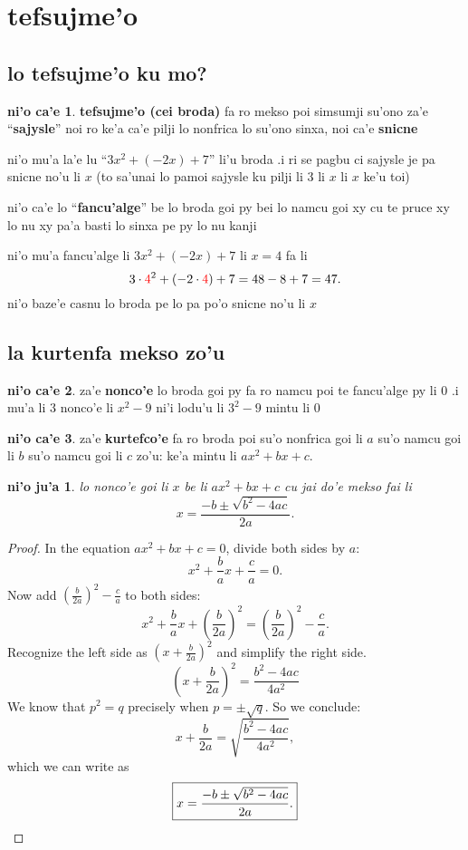 \documentclass[12pt,a4paper]{article}
\newcommand{\red}[1]{{\color{red}#1}}
\theoremstyle{plain}\newtheorem*{mythm}{ni'o ju'a}
\theoremstyle{definition}\newtheorem*{mydef}{ni'o ca'e}
\begin{document}
\section{tefsujme'o}
\subsection{lo tefsujme'o ku mo?}
\begin{mydef}
	\textbf{tefsujme'o (cei broda)} fa ro mekso poi simsumji su'ono za'e ``\textbf{sajysle}'' noi ro ke'a ca'e pilji lo nonfrica lo su'ono sinxa, noi ca'e \textbf{snicne}
\end{mydef}

ni'o mu'a la'e lu ``$3x^2 + (-2x) + 7$'' li'u broda .i ri se pagbu ci sajysle je pa snicne no'u li $x$ (to sa'unai lo pamoi sajysle ku pilji li $3$ li $x$ li $x$ ke'u toi)

ni'o ca'e lo ``\textbf{fancu'alge}'' be lo broda goi py bei lo namcu goi xy cu te pruce xy lo nu xy pa'a basti lo sinxa pe py lo nu kanji

ni'o mu'a fancu'alge li $3x^2 + (-2x) + 7$ li $x=4$ fa li \[
3 \cdot \red{4}^2 + (-2 \cdot \red{4}) + 7 = 48 - 8 + 7 = 47.
\]
ni'o baze'e casnu lo broda pe lo pa po'o snicne no'u li $x$

\subsection{la kurtenfa mekso zo'u}
\begin{mydef}
	za'e \textbf{nonco'e} lo broda goi py fa ro namcu poi te fancu'alge py li 0 .i mu'a li 3 nonco'e li $x^2-9$ ni'i lodu'u li $3^2 - 9$ mintu li $0$
\end{mydef}

\begin{mydef}
	za'e \textbf{kurtefco'e} fa ro broda poi su'o nonfrica goi li $a$ su'o namcu goi li $b$ su'o namcu goi li $c$ zo'u: ke'a mintu li $ax^2 + bx + c$.
\end{mydef}

\begin{mythm}
	lo nonco'e goi li $x$ be li $a x^2 + b x + c$ cu jai do'e mekso fai li \[
	\boxed{x = \frac{-b \pm \sqrt{b^2-4ac}}{2a}.}
	\]
\end{mythm}

\begin{proof}
	In the equation $a x^2 + b x + c = 0$, divide both sides by $a$: \[
	x^2 + \frac{b}{a} x + \frac{c}{a} = 0.
	\]
	Now add $\left( \frac{b}{2a} \right)^2 - \frac{c}{a}$ to both sides: \[
	x^2 + \frac{b}{a} x + \left( \frac{b}{2a} \right)^2 = \left( \frac{b}{2a} \right)^2 - \frac{c}{a}.
	\]
	Recognize the left side as $(x + \frac{b}{2a})^2$ and simplify the right side. \[
	\left(x + \frac{b}{2a}\right)^2 = \frac{b^2 - 4ac}{4a^2}
	\]
	We know that $p^2 = q$ precisely when $p = \pm \sqrt{q}$. So we conclude: \[
	x + \frac{b}{2a} = \sqrt{\frac{b^2 - 4ac}{4a^2}},
	\]
	which we can write as \[
	\boxed{x = \frac{-b \pm \sqrt{b^2 - 4ac}}{2a}.} \qedhere
	\]
\end{proof}
\end{document}
